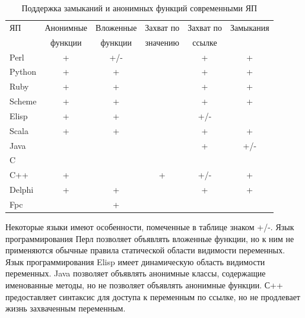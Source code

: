 \documentclass{imcs}
\begin{document}
\begin{table}[h!]
\begin{center}
\begin{tabular}{|l|c|c|c|c|c|}
\hline
  ЯП     &  Анонимные  &  Вложенные  &  Захват по  &  Захват по  &  Замыкания  \\
         &  функции    &  функции    &  значению   &  ссылке     &             \\
\hline
 Perl    &  +          &  +/-        &             &  +          &  +          \\
\hline
 Python  &  +          &  +          &             &  +          &  +          \\
\hline
 Ruby    &  +          &  +          &             &  +          &  +          \\
\hline
 Scheme  &  +          &  +          &             &  +          &  +          \\
\hline
 Elisp   &  +          &  +          &             &  +/-        &             \\
\hline
 Scala   &  +          &  +          &             &  +          &  +          \\
\hline
 Java    &             &             &             &  +          &  +/-        \\
\hline
 C       &             &             &             &             &             \\
\hline
 C++     &  +          &             &  +          &  +/-        &  +          \\
\hline
 Delphi  &  +          &  +          &             &  +          &  +          \\
\hline
 Fpc     &             &  +          &             &             &             \\
\hline
\end{tabular}
\caption{Поддержка замыканий и анонимных функций современными ЯП}\label{tab:wsi_diff_rel}
\end{center}
\end{table}

Некоторые языки имеют особенности, помеченные в таблице знаком +/-.
Язык программирования Перл позволяет объявлять вложенные функции, но к ним не применяются обычные правила
статической области видимости переменных. Язык программирования Elisp имеет динамическую область 
видимости переменных. Java позволяет объявлять анонимные классы, содержащие именованные методы, но не 
позволяет объявлять анонимные функции. С++ предоставляет синтаксис для доступа к переменным по ссылке,
но не продлевает жизнь захваченным переменным.
\end{document}
